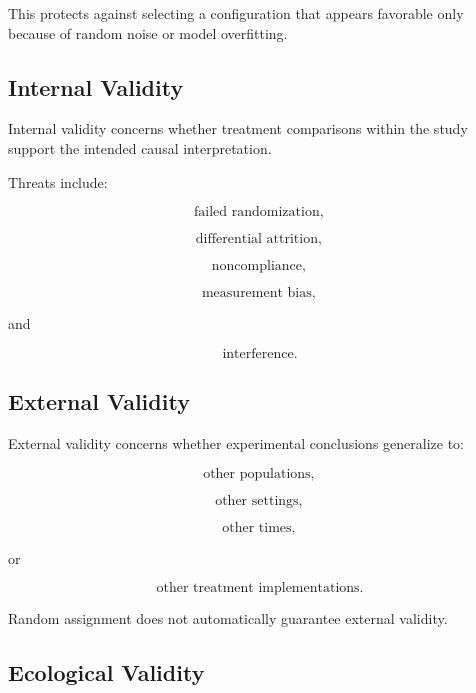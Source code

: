 This protects against selecting a configuration that appears favorable
only because of random noise or model overfitting.

\subsection{Internal Validity}
\label{subsec:internal-validity-experiment}

Internal validity concerns whether treatment comparisons within the study
support the intended causal interpretation.

Threats include:

\[
\boxed{
\text{failed randomization},
}
\]

\[
\boxed{
\text{differential attrition},
}
\]

\[
\boxed{
\text{noncompliance},
}
\]

\[
\boxed{
\text{measurement bias},
}
\]

and

\[
\boxed{
\text{interference}.
}
\]

\subsection{External Validity}
\label{subsec:external-validity-experiment}

External validity concerns whether experimental conclusions generalize
to:

\[
\boxed{
\text{other populations},
}
\]

\[
\boxed{
\text{other settings},
}
\]

\[
\boxed{
\text{other times},
}
\]

or

\[
\boxed{
\text{other treatment implementations}.
}
\]

Random assignment does not automatically guarantee external validity.

\subsection{Ecological Validity}
\label{subsec:ecological-validity}


